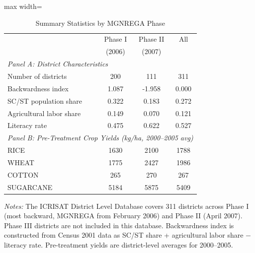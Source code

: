 \begin{table}[htbp]
\centering
\caption{Summary Statistics by MGNREGA Phase}
\label{tab:summary}
\begin{adjustbox}{max width=\textwidth}
\begin{tabular}{lccc}
\hline\hline
 & Phase I & Phase II & All \\
 & (2006) & (2007) & \\
\hline
\multicolumn{4}{l}{\textit{Panel A: District Characteristics}} \\
Number of districts & 200 & 111 & 311 \\
Backwardness index & 1.087 & -1.958 & 0.000 \\
SC/ST population share & 0.322 & 0.183 & 0.272 \\
Agricultural labor share & 0.149 & 0.070 & 0.121 \\
Literacy rate & 0.475 & 0.622 & 0.527 \\
\hline
\multicolumn{4}{l}{\textit{Panel B: Pre-Treatment Crop Yields (kg/ha, 2000--2005 avg)}} \\
RICE & 1630 & 2100 & 1788 \\
WHEAT & 1775 & 2427 & 1986 \\
COTTON & 265 & 270 & 267 \\
SUGARCANE & 5184 & 5875 & 5409 \\
\hline\hline
\end{tabular}
\end{adjustbox}

\par \raggedright \footnotesize
\textit{Notes:} The ICRISAT District Level Database covers 311 districts across Phase I (most backward, MGNREGA from February 2006) and Phase II (April 2007). Phase III districts are not included in this database. Backwardness index is constructed from Census 2001 data as SC/ST share + agricultural labor share $-$ literacy rate. Pre-treatment yields are district-level averages for 2000--2005.
\end{table}

